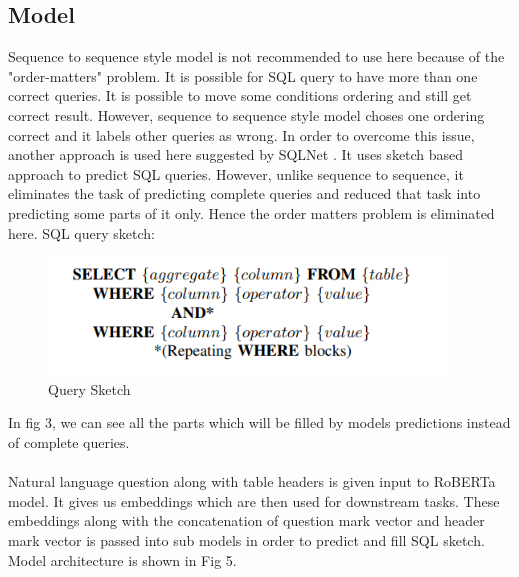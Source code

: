 \documentclass[12pt]{article}
\begin{document}
\subsection{Model}
Sequence to sequence style model is not recommended to use here because of the "order-matters" problem. It is possible for SQL query to have more than one correct queries. It is possible to move some conditions ordering and still get correct result. However, sequence to sequence style model choses one ordering correct and it labels other queries as wrong. In order to overcome this issue, another approach is used here suggested by SQLNet \cite{xu2017sqlnet}. It uses sketch based approach to predict SQL queries. However, unlike sequence to sequence, it eliminates the task of predicting complete queries and reduced that task into predicting some parts of it only. Hence the order matters problem is eliminated here. SQL query sketch:
 
\begin{figure}[H]
    \includegraphics[width=300pt]{sketch}
    \caption{Query Sketch}
    \label{fig:Query Sketch}
\end{figure}

In fig 3, we can see all the parts which will be filled by models predictions instead of complete queries. 
\\
\\
Natural language question along with table headers is given input to RoBERTa model. It gives us embeddings which are then used for downstream tasks.  These embeddings along with the concatenation of question mark vector and header mark vector is passed into sub models in order to predict and fill SQL sketch. Model architecture is shown in Fig 5. 
\end{document}
